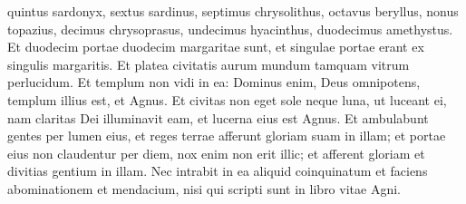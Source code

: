 \begin{biblechapter}
\verse quintus sardonyx, sextus sardinus, septimus chrysolithus, octavus beryllus, nonus topazius, decimus chrysoprasus, undecimus hyacinthus, duodecimus amethystus. 
\verse Et duodecim portae duodecim margaritae sunt, et singulae portae erant ex singulis margaritis. Et platea civitatis aurum mundum tamquam vitrum perlucidum. 
\verse Et templum non vidi in ea: Dominus enim, Deus omnipotens, templum illius est, et Agnus. 
\verse Et civitas non eget sole neque luna, ut luceant ei, nam claritas Dei illuminavit eam, et lucerna eius est Agnus. 
\verse Et ambulabunt gentes per lumen eius, et reges terrae afferunt gloriam suam in illam; 
\verse et portae eius non claudentur per diem, nox enim non erit illic; 
\verse et afferent gloriam et divitias gentium in illam. 
\verse Nec intrabit in ea aliquid coinquinatum et faciens abominationem et mendacium, nisi qui scripti sunt in libro vitae Agni. 
\end{biblechapter}

